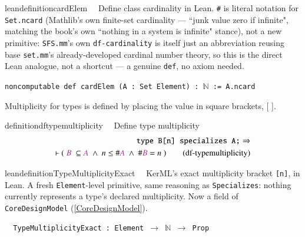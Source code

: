 \begin{restatable}{leandefinition}{cardElem}~~ Define class cardinality in Lean. \texttt{\#}
is literal notation for \texttt{Set.ncard} (Mathlib's own finite-set cardinality --- ``junk value zero if
infinite", matching the book's own ``nothing in a system is infinite" stance), not a new primitive:
\texttt{SFS.mm}'s own \texttt{df-cardinality} is itself just an abbreviation reusing base \texttt{set.mm}'s
already-developed cardinal number theory, so this is the direct Lean analogue, not a shortcut --- a genuine
\texttt{def}, no axiom needed.

\texttt{\textcolor{leancolor}{noncomputable def} \textcolor{leanyellow}{cardElem} (A : Set Element) : $\mathbb{N}$ := A.ncard}
\label{cardElem}
\end{restatable}

\pn Multiplicity for types is defined by placing the value in square brackets, [ ].

\begin{restatable}{definition}{dftypemultiplicity}~~ Define type multiplicity
\begin{align}
\texttt{type B[n] specializes A;} \Rightarrow \notag \\
\vdash (~\mc{B}~\subseteq \mc{A}~\wedge~n\le\#\mc{A}~\wedge~\#\mc{B}=n~)
\label{eq:df-typemultiplicity}\tag{df-typemultiplicity}
\end{align}
\end{restatable}

\begin{restatable}{leandefinition}{TypeMultiplicityExact}~~ KerML's exact
multiplicity bracket \texttt{[n]}, in Lean. A fresh \texttt{Element}-level primitive, same reasoning as
\texttt{Specializes}: nothing currently represents a type's declared multiplicity. Now a field of
\texttt{CoreDesignModel} (\ref{CoreDesignModel}).

\texttt{~~TypeMultiplicityExact : Element $\to$ $\mathbb{N}$ $\to$ Prop}
\label{TypeMultiplicityExact}
\end{restatable}

